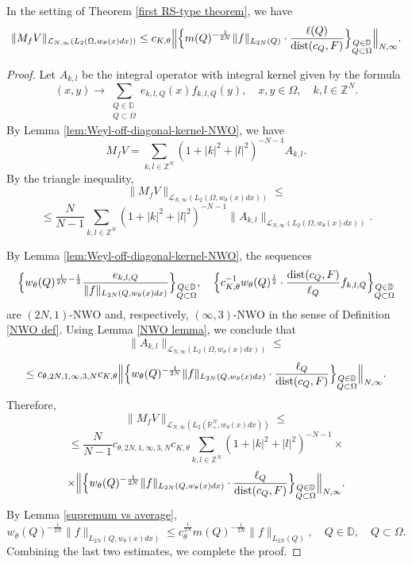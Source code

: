 \documentclass{amsart}
\begin{document}
\begin{lemma}\label{first RS intermediate estimate} In the setting of Theorem \ref{first RS-type theorem}, we have
$$\|M_fV\|_{\mathcal{L}_{N,\infty}(L_2(\Omega,w_{\theta}(x)dx))}\leq c_{K,\theta}\Big\|\Big\{m(Q)^{-\frac1{2N}}\|f\|_{L_{2N}(Q)}\cdot\frac{\ell(Q)}{{\rm dist}(c_Q,F)}\Big\}_{\substack{Q\in\mathbb{D}\\ Q\subset\Omega}}
\Big\|_{N,\infty}.$$
\end{lemma}
\begin{proof} Let $A_{k,l}$ be the integral operator with integral kernel given by the formula
$$(x,y)\to\sum_{\substack{Q\in\mathbb{D}\\ Q\subset\Omega}}e_{k,l,Q}(x)f_{k,l,Q}(y),\quad x,y\in\Omega,\quad k,l\in\mathbb{Z}^N.$$
By Lemma \ref{lem:Weyl-off-diagonal-kernel-NWO}, we have
$$M_fV=\sum_{k,l\in\mathbb{Z}^N}(1+|k|^2+|l|^2)^{-N-1}A_{k,l}.$$
By the triangle inequality,
$$\|M_fV\|_{\mathcal{L}_{N,\infty}(L_2(\Omega,w_{\theta}(x)dx))}\leq$$
$$\leq \frac{N}{N-1}\sum_{k,l\in\mathbb{Z}^N}(1+|k|^2+|l|^2)^{-N-1} \|A_{k,l}\|_{\mathcal{L}_{N,\infty}(L_2(\Omega,w_{\theta}(x)dx))}.$$

By Lemma \ref{lem:Weyl-off-diagonal-kernel-NWO}, the sequences
$$\Big\{w_{\theta}(Q)^{\frac1{2N}-\frac12}\frac{e_{k,l,Q}}{\|f\|_{L_{2N}(Q,w_{\theta}(x)dx)}}\Big\}_{\substack{Q\in\mathbb{D}\\ Q\subset\Omega}},\quad \Big\{c_{K,\theta}^{-1}w_{\theta}(Q)^{\frac12}\cdot\frac{{\rm dist}(c_Q,F)}{\ell_Q}f_{k,l,Q}\Big\}_{\substack{Q\in\mathbb{D}\\ Q\subset\Omega}}$$
are $(2N,1)$-NWO and, respectively, $(\infty,3)$-NWO in the sense of Definition \ref{NWO def}. Using Lemma \ref{NWO lemma}, we conclude that
$$\|A_{k,l}\|_{\mathcal{L}_{N,\infty}(L_2(\Omega,w_{\theta}(x)dx))}\leq$$
$$\leq c_{\theta,2N,1,\infty,3,N}c_{K,\theta}\Big\|\Big\{w_{\theta}(Q)^{-\frac1{2N}}\|f\|_{L_{2N}(Q,w_{\theta}(x)dx)}\cdot\frac{\ell_Q}{{\rm dist}(c_Q,F)}\Big\}_{\substack{Q\in\mathbb{D}\\ Q\subset\Omega}}\Big\|_{N,\infty}.$$
Therefore,
$$\|M_fV\|_{\mathcal{L}_{N,\infty}(L_2(\mathbb{R}^N_+,w_{\theta}(x)dx))}\leq$$
$$\leq \frac{N}{N-1}c_{\theta,2N,1,\infty,3,N}c_{K,\theta}\sum_{k,l\in\mathbb{Z}^N}(1+|k|^2+|l|^2)^{-N-1}\times$$
$$\times \Big\|\Big\{w_{\theta}(Q)^{-\frac1{2N}}\|f\|_{L_{2N}(Q,w_{\theta}(x)dx)}\cdot\frac{\ell_Q}{{\rm dist}(c_Q,F)}\Big\}_{\substack{Q\in\mathbb{D}\\ Q\subset\Omega}}\Big\|_{N,\infty}.$$
By Lemma \ref{supremum vs average},
$$w_{\theta}(Q)^{-\frac1{2N}}\|f\|_{L_{2N}(Q,w_{\theta}(x)dx)}\leq c_{\theta}^{\frac1{2N}}m(Q)^{-\frac1{2N}}\|f\|_{L_{2N}(Q)},\quad Q\in\mathbb{D},\quad Q\subset\Omega.$$
Combining the last two estimates, we complete the proof.
\end{proof}
\end{document}
